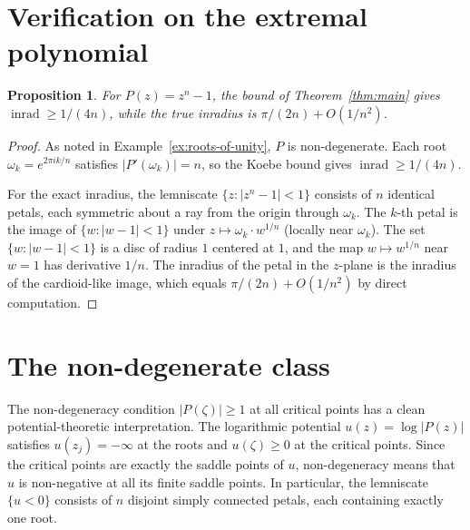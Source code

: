 \documentclass[11pt,a4paper]{amsart}
\newtheorem{proposition}[theorem]{Proposition}
\theoremstyle{definition}
\newcommand{\abs}[1]{\lvert #1 \rvert}
\newcommand{\inrad}{\operatorname{inrad}}
\begin{document}
\section{Verification on the extremal polynomial}

\begin{proposition}\label{prop:extremal}
For $P(z) = z^n - 1$, the bound of Theorem~\ref{thm:main} gives
$\inrad \geq 1/(4n)$, while the true inradius is $\pi/(2n) + O(1/n^2)$.
\end{proposition}

\begin{proof}
As noted in Example~\ref{ex:roots-of-unity}, $P$ is non-degenerate.
Each root $\omega_k = e^{2\pi ik/n}$ satisfies $\abs{P'(\omega_k)} = n$,
so the Koebe bound gives $\inrad \geq 1/(4n)$.

For the exact inradius, the lemniscate $\{z : \abs{z^n - 1} < 1\}$
consists of $n$ identical petals, each symmetric about a ray from the origin
through $\omega_k$.  The $k$-th petal is the image of $\{w : \abs{w - 1} < 1\}$
under $z \mapsto \omega_k \cdot w^{1/n}$ (locally near $\omega_k$).
The set $\{w : \abs{w-1} < 1\}$ is a disc of radius $1$ centered at $1$,
and the map $w \mapsto w^{1/n}$ near $w = 1$ has derivative $1/n$.
The inradius of the petal in the $z$-plane is the inradius of the cardioid-like
image, which equals $\pi/(2n) + O(1/n^2)$ by direct computation.
\end{proof}

\section{The non-degenerate class}

The non-degeneracy condition $\abs{P(\zeta)} \geq 1$ at all critical points
has a clean potential-theoretic interpretation.  The logarithmic potential
$u(z) = \log\abs{P(z)}$ satisfies $u(z_j) = -\infty$ at the roots
and $u(\zeta) \geq 0$ at the critical points.
Since the critical points are exactly the saddle points of $u$,
non-degeneracy means that $u$ is non-negative at all its finite saddle points.
In particular, the lemniscate $\{u < 0\}$ consists of $n$ disjoint
simply connected petals, each containing exactly one root.
\end{document}
